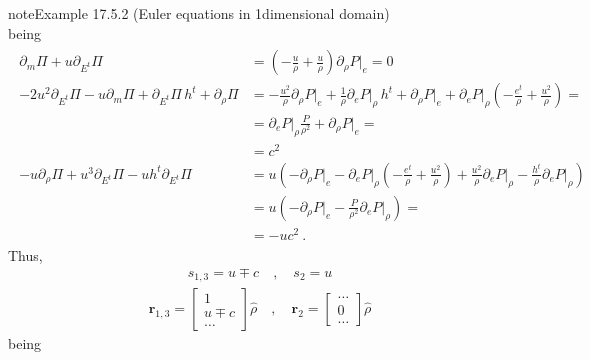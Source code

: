 \documentclass[letterpaper,10pt,english]{jupyterBook}
\begin{document}
\begin{sphinxadmonition}{note}{Example 17.5.2 (Euler equations in 1\sphinxhyphen{}dimensional domain)}
\begin{equation*}
\end{equation*}
\sphinxAtStartPar
being
\begin{equation*}
\begin{split}\begin{aligned}
  \partial_m \Pi + u \partial_{E^t} \Pi
  & = \left( - \frac{u}{\rho}  + \frac{u}{\rho} \right) \partial_\rho P \big|_e = 0 \\
  - 2u^2 \partial_{E^t} \Pi - u \partial_m \Pi + \partial_{E^t} \Pi \, h^t + \partial_{\rho} \Pi 
  & =  - \frac{u^2}{\rho} \partial_\rho P\big|_e + \frac{1}{\rho} \partial_e P\big|_\rho \, h^t + \partial_\rho P\big|_e + \partial_e P\big|_\rho \left( -\frac{e^t}{\rho} + \frac{u^2}{\rho} \right) = \\
  & = \partial_{e} P \big|_{\rho} \frac{P}{\rho^2} + \partial_{\rho} P \big|_e = \\
  & = c^2 \\
 - u \partial_{\rho} \Pi + u^3 \partial_{E^t} \Pi - u h^t \partial_{E^t} \Pi
  & = u \left( - \partial_\rho P \big|_e - \partial_e P \big|_{\rho} \left( -\frac{e^t}{\rho} + \frac{u^2}{\rho} \right) + \frac{u^2}{\rho} \partial_e P\big|_\rho - \frac{h^t}{\rho} \partial_e P\big|_{\rho}  \right) \\
  & = u \left( -\partial_\rho P\big|_e - \frac{P}{\rho^2} \partial_e P \big|_\rho \right) = \\
  & = - u c^2 \ .
\end{aligned}\end{split}
\end{equation*}
\sphinxAtStartPar
Thus,
\begin{equation*}
\begin{split}s_{1,3} = u \mp c \quad , \quad s_{2} = u \end{split}
\end{equation*}\begin{equation*}
\begin{split}
\mathbf{r}_{1,3} = \begin{bmatrix} 1 \\ u \mp c \\ \dots \end{bmatrix} \hat{\rho}
 \quad , \quad
\mathbf{r}_2 = \begin{bmatrix} \dots \\ 0 \\ \dots \end{bmatrix} \hat{\rho}
\end{split}
\end{equation*}
\sphinxAtStartPar
being

\end{sphinxadmonition}
\end{document}
